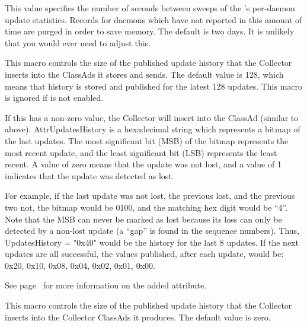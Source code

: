 \begin{description}
\label{param:CollectorStatsSweep}
\item[\Macro{COLLECTOR\_STATS\_SWEEP}]
  This value specifies the number of
  seconds between sweeps of the 's per-daemon update
  statistics.  Records for daemons which have not reported in this amount
  of time are purged in order to save memory.  The default is two days.
  It is unlikely that you would ever need to adjust this.

\label{param:CollectorDaemonHistorySize}
\item[\Macro{COLLECTOR\_DAEMON\_HISTORY\_SIZE}]
  This macro controls the
  size of the published update history that the Collector inserts into
  the ClassAds it stores and sends.  The default value is 128, which
  means that history is stored and published for the latest 128
  updates.  This macro is ignored if 
  is not enabled.

  If this has a non-zero value, the Collector will insert
   into the ClassAd (similar to 
  above). Attr{UpdatesHistory} is a hexadecimal string which represents
  a bitmap of the last 
  updates.  The most significant bit (MSB) of the bitmap represents the
  most recent update, and the least significant bit (LSB) represents
  the least recent.  A value of zero means that the update was not
  lost, and a value of 1 indicates that the update was detected as
  lost.

  For example, if the last update was not lost, the previous lost, and
  the previous two not, the bitmap would be 0100, and the matching hex
  digit would be ``4''.  Note that the MSB can never be marked as lost
  because its loss can only be detected by a non-lost update (a
  ``gap'' is found in the sequence numbers).  Thus, UpdatesHistory =
  "0x40" would be the history for the last 8 updates.  If the next
  updates are all successful, the values published, after each update,
  would be: 0x20, 0x10, 0x08, 0x04, 0x02, 0x01, 0x00.

  See page~\pageref{sec:Collector-Added-Attributes} for more information on the
  added attribute.


\label{param:CollectorClassHistorySize}
\item[\Macro{COLLECTOR\_CLASS\_HISTORY\_SIZE}]
  This macro controls the
  size of the published update history that the Collector inserts into
  the Collector ClassAds it produces.  The default value is zero.


\end{description}
